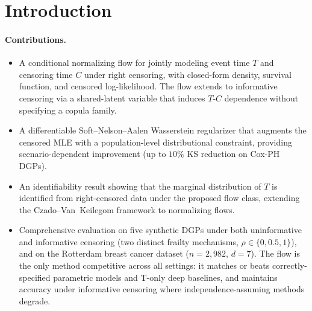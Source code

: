 \section{Introduction}
\label{sec:intro}


\paragraph{Contributions.}
\begin{itemize}
    \item A conditional normalizing flow for jointly modeling event time
          $T$ and censoring time $C$ under right censoring, with
          closed-form density, survival function, and censored
          log-likelihood. The flow extends to informative censoring via a
          shared-latent variable that induces $T$-$C$ dependence without
          specifying a copula family.
    \item A differentiable Soft--Nelson--Aalen Wasserstein regularizer
          that augments the censored MLE with a population-level
          distributional constraint, providing scenario-dependent
          improvement (up to $10\%$ KS reduction on Cox-PH DGPs).
    \item An identifiability result showing that the marginal distribution
          of $T$ is identified from right-censored data under the proposed
          flow class, extending the Czado--Van~Keilegom framework to
          normalizing flows.
    \item Comprehensive evaluation on five synthetic DGPs under both
          uninformative and informative censoring (two distinct frailty
          mechanisms, $\rho \in \{0, 0.5, 1\}$), and on the Rotterdam
          breast cancer dataset ($n = 2{,}982$, $d = 7$). The flow is the
          only method competitive across all settings: it matches or beats
          correctly-specified parametric models and T-only deep baselines,
          and maintains accuracy under informative censoring where
          independence-assuming methods degrade.
\end{itemize}
